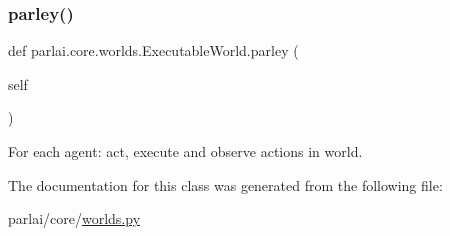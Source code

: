 \subsubsection{\texorpdfstring{parley()}{parley()}}
{\footnotesize\ttfamily def parlai.\+core.\+worlds.\+Executable\+World.\+parley (\begin{DoxyParamCaption}\item[{}]{self }\end{DoxyParamCaption})}

\begin{DoxyVerb}For each agent: act, execute and observe actions in world.
\end{DoxyVerb}
 

The documentation for this class was generated from the following file\+:\begin{DoxyCompactItemize}
\item 
parlai/core/\hyperlink{parlai_2core_2worlds_8py}{worlds.\+py}\end{DoxyCompactItemize}
